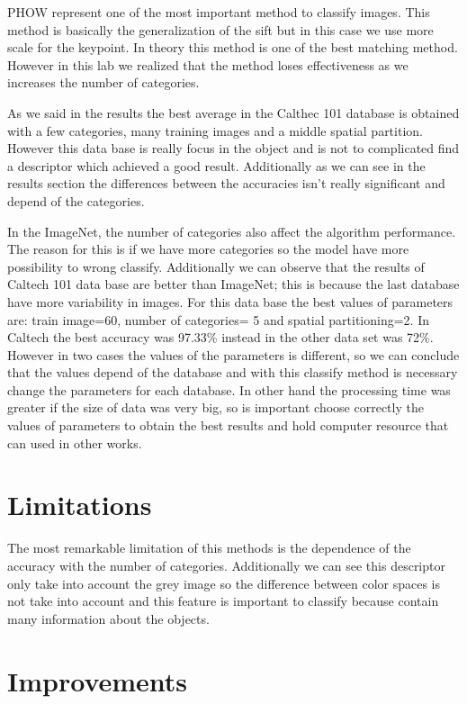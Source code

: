 \documentclass[10pt,twocolumn,letterpaper]{article}
\begin{document}
PHOW represent one of the most important method to classify images. This method is basically the generalization of the sift but in this case we use more scale for the keypoint. In theory this method is one of the best matching method. However in this lab we realized that the method loses effectiveness as we increases the number of categories.

As we said in the results the best average in the Calthec 101 database is obtained with a few categories, many training images and a middle spatial partition. However this data base is really focus in the object and is not to complicated find a descriptor which achieved a good result. Additionally as we can see in the results section the differences between the accuracies isn't really significant and depend of the categories.

In the ImageNet, the number of categories also affect the algorithm performance. The reason for this is if we have more categories so the model have more possibility to wrong classify. Additionally we can observe that the results of Caltech 101 data base are better than ImageNet; this is because the last database have more variability in images. For this data base the best values of parameters are: train image=60, number of categories= 5 and spatial partitioning=2. In Caltech the best accuracy was 97.33\% instead in the other data set was 72\%. However in two cases the values of the parameters is different, so we can conclude that the values depend of the database and with this classify method is necessary change the parameters for each database. 
In other hand the processing time was greater if the size of data was very big, so is important choose correctly the values of parameters to obtain the best results and hold computer resource that can used in other works. 

\section{Limitations}

The most remarkable limitation of this methods is the dependence of the accuracy with the number of categories. Additionally we can see this descriptor only take into account the grey image so the difference between color spaces is not take into account and this feature is important to classify because contain many information about the objects.  

\section{Improvements}
\end{document}
